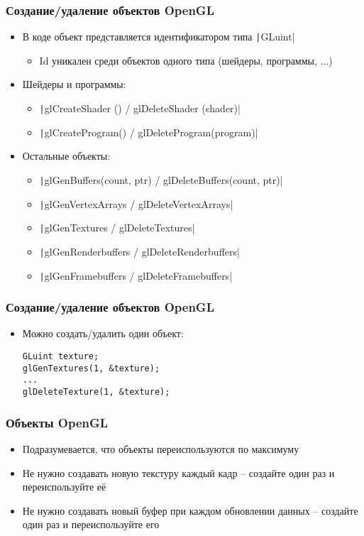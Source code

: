 \documentclass[10pt]{beamer}
\begin{document}
\begin{frame}[fragile]
\frametitle{Создание/удаление объектов OpenGL}
\begin{itemize}
\item В коде объект представляется идентификатором типа \texttt|GLuint|
\begin{itemize}
\item Id уникален среди объектов одного типа (шейдеры, программы, ...)
\end{itemize}
\pause
\item Шейдеры и программы:
\begin{itemize}
\item \texttt|glCreateShader () / glDeleteShader (shader)|
\item \texttt|glCreateProgram() / glDeleteProgram(program)|
\end{itemize}
\pause
\item Остальные объекты:
\begin{itemize}
\item \texttt|glGenBuffers(count, ptr) / glDeleteBuffers(count, ptr)|
\item \texttt|glGenVertexArrays        / glDeleteVertexArrays|
\item \texttt|glGenTextures            / glDeleteTextures|
\item \texttt|glGenRenderbuffers       / glDeleteRenderbuffers|
\item \texttt|glGenFramebuffers        / glDeleteFramebuffers|
\end{itemize}
\end{itemize}
\end{frame}

\begin{frame}[fragile]
\frametitle{Создание/удаление объектов OpenGL}
\begin{itemize}
\item Можно создать/удалить один объект:
\begin{verbatim}
GLuint texture;
glGenTextures(1, &texture);
...
glDeleteTexture(1, &texture);
\end{verbatim}
\end{itemize}
\end{frame}

\begin{frame}[fragile]
\frametitle{Объекты OpenGL}
\begin{itemize}
\item Подразумевается, что объекты переиспользуются по максимуму
\item Не нужно создавать новую текстуру каждый кадр -- создайте один раз и переиспользуйте её
\item Не нужно создавать новый буфер при каждом обновлении данных -- создайте один раз и переиспользуйте его
\end{itemize}
\end{frame}
\end{document}
